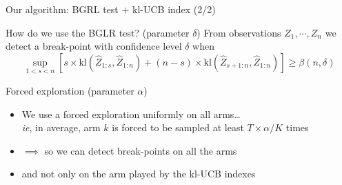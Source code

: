 \documentclass[11pt,english,ignorenonframetext,]{beamer}
\begin{document}
\begin{frame}{Our algorithm: BGRL test + kl-UCB index (2/2)}



  \begin{exampleblock}{How do we use the BGLR test? \hfill{} (parameter $\delta$)}
    From observations $Z_1,\cdots,Z_n$
    we detect a break-point
    with confidence level $\delta$
    when
      \[
        \sup_{1 < s < n} \left[s \times \mathrm{kl} \left( \widehat{Z}_{1:s}, \widehat{Z}_{1:n}\right) + (n-s) \times \mathrm{kl} \left( \widehat{Z}_{s+1:n}, \widehat{Z}_{1:n} \right) \right] \geq \beta(n,\delta)
        \]
  \end{exampleblock}

  \pause

  \begin{exampleblock}{Forced exploration \hfill{} (parameter $\alpha$)}
    \begin{itemize}
      \item We use a forced exploration uniformly on all arms\ldots\\
        \emph{ie}, in average, arm $k$ is forced to be sampled at least $T \times \alpha / K$ times
      \item $\implies$ so we can detect break-points on all the arms
      \item and not only on the arm played by the kl-UCB indexes
    \end{itemize}
  \end{exampleblock}

\end{frame}
\end{document}
